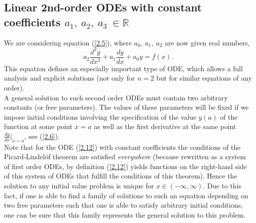 \documentclass[11pt,a4paper]{article}
\begin{document}
	\subsection{Linear 2nd-order ODEs with constant coefficients $a_1,\ a_2,\ a_3\ \in \mathbb{R}$}
	We are considering equation (\ref{2.5}), where $a_0,\ a_1,\ a_2$ are now given real numbers,
	\begin{equation}\label{2.12}
		a_2\frac{d^2y}{dx^2}+a_1\frac{dy}{dx}+a_0y = f(x).
	\end{equation}
	This equation defines an especially important type of ODE, which allows a full analysis and explicit solutions (not only for $n = 2$ but for similar equations of any order).\\
	A general solution to such second order ODEs must contain two arbitrary constants (or free parameters). The values of these parameters will be fixed if we impose initial conditions involving the specification of the value $y(a)$ of the function at some point $x = a$ as well as the first derivative at the same point $\frac{dy}{dx}|_{x=a}$, see (\ref{2.6}).\\
	Note that for the ODE (\ref{2.12}) with constant coefficients the conditions of the Picard-Lindel\"{o}f theorem are satisfied \textit{everywhere} (because rewritten as a system of first order ODEs, by definition (\ref{2.12}) yields functions on the right-hand side of this system of ODEs that fulfill the conditions of this theorem). Hence the solution to any initial value problem is unique for $x \in (−\infty, \infty)$. Due to this fact, if one is able to find a family of solutions to such an equation depending on two free parameters such that one is able to satisfy arbitrary initial conditions, one can be sure that this family represents the general solution to this problem.
\end{document}
